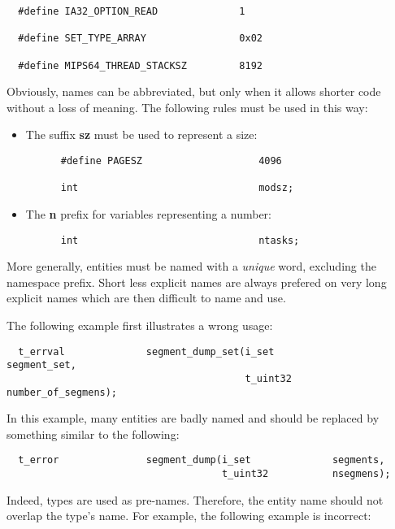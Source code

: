 \begin{verbatim}
  #define IA32_OPTION_READ              1

  #define SET_TYPE_ARRAY                0x02

  #define MIPS64_THREAD_STACKSZ         8192
\end{verbatim}

Obviously, names can be abbreviated, but only when it allows shorter code
without a loss of meaning. The following rules must be used in this way:

\begin{itemize}
  \item
    The suffix \textbf{sz} must be used to represent a size:

    \begin{verbatim}
      #define PAGESZ                    4096

      int                               modsz;
    \end{verbatim}
  \item
    The \textbf{n} prefix for variables representing a number:

    \begin{verbatim}
      int                               ntasks;
    \end{verbatim}
\end{itemize}

More generally, entities must be named with a \textit{unique} word,
excluding the namespace prefix. Short less explicit names are always prefered
on very long explicit names which are then difficult to name and use.

The following example first illustrates a wrong usage:

\begin{verbatim}
  t_errval              segment_dump_set(i_set              segment_set,
                                         t_uint32           number_of_segmens);
\end{verbatim}

In this example, many entities are badly named and should be replaced by
something similar to the following:

\begin{verbatim}
  t_error               segment_dump(i_set              segments,
                                     t_uint32           nsegmens);
\end{verbatim}

Indeed, types are used as pre-names. Therefore, the entity name should
not overlap the type's name. For example, the following example is incorrect:


